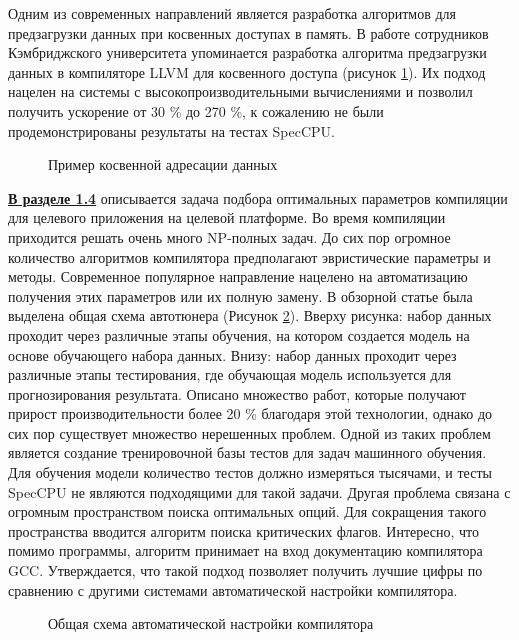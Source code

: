 Одним из современных направлений является разработка
алгоритмов для предзагрузки данных при косвенных доступах в память. В работе
сотрудников Кэмбриджского университета упоминается разработка
алгоритма предзагрузки данных в компиляторе LLVM для косвенного доступа (рисунок \ref{syn:prefetch3}).
Их подход нацелен на системы с высокопроизводительными вычислениями и
позволил получить ускорение от 30 \% до 270 \%, к сожалению не были продемонстрированы
результаты на тестах SpecCPU. 

\begin{figure}[htbp]
	\centering
	
	\caption{Пример косвенной адресации данных}
	\label{syn:prefetch3}
\end{figure}

\underline{\textbf{В разделе 1.4}} описывается задача подбора оптимальных параметров компиляции
для целевого приложения на целевой платформе. Во время компиляции приходится
решать очень много NP-полных задач. До сих пор огромное количество алгоритмов
компилятора предполагают эвристические параметры и методы.
Современное популярное направление нацелено  на автоматизацию получения этих параметров или их полную замену. В обзорной статье была  выделена общая схема автотюнера (Рисунок \ref{syn:ml_for_comp1}). Вверху
рисунка: набор данных проходит через различные этапы обучения, на котором
создается модель на основе обучающего набора данных. Внизу: набор данных
проходит через различные этапы тестирования, где обучающая модель используется
для прогнозирования результата. Описано множество работ, которые получают прирост производительности более 20 \% благодаря этой технологии, однако до сих пор существует множество нерешенных проблем. Одной из таких проблем является создание тренировочной базы тестов для задач машинного обучения. 
Для обучения модели количество тестов должно измеряться тысячами, и тесты SpecCPU не являются подходящими для такой задачи. Другая проблема связана с огромным пространством поиска оптимальных опций.  Для сокращения такого пространства вводится алгоритм поиска критических
флагов. Интересно, что помимо программы, алгоритм принимает на вход
документацию компилятора GCC. Утверждается, что такой подход позволяет
получить лучшие цифры по сравнению с другими системами автоматической
настройки компилятора.



 \begin{figure}[htbp]
	\centering
	
	\caption{Общая схема автоматической настройки компилятора}
	\label{syn:ml_for_comp1}
\end{figure}




